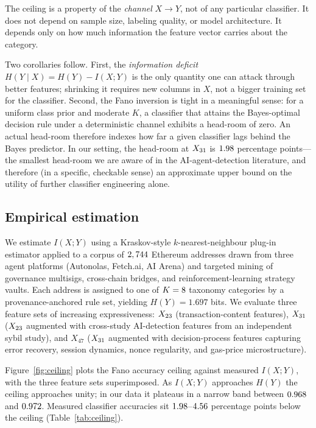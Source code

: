 \documentclass[11pt,a4paper]{article}
\begin{document}
The ceiling is a property of the \emph{channel} $X \to Y$, not of any
particular classifier. It does not depend on sample size, labeling quality,
or model architecture. It depends only on how much information the feature
vector carries about the category.

Two corollaries follow. First, the \emph{information deficit}
$H(Y \mid X) = H(Y) - I(X;Y)$ is the only quantity one can attack through
better features; shrinking it requires new columns in $X$, not a bigger
training set for the classifier. Second, the Fano inversion is tight in a
meaningful sense: for a uniform class prior and moderate $K$, a classifier
that attains the Bayes-optimal decision rule under a deterministic channel
exhibits a head-room of zero. An actual head-room therefore indexes how
far a given classifier lags behind the Bayes predictor. In our setting,
the head-room at $X_{31}$ is $1.98$ percentage points---the smallest
head-room we are aware of in the AI-agent-detection literature, and
therefore (in a specific, checkable sense) an approximate upper bound on
the utility of further classifier engineering alone.

\subsection*{Empirical estimation}

We estimate $I(X;Y)$ using a Kraskov-style $k$-nearest-neighbour plug-in
estimator\cite{kraskov2004estimating} applied to a corpus of $2,744$
Ethereum addresses drawn from three agent platforms (Autonolas, Fetch.ai,
AI Arena) and targeted mining of governance multisigs, cross-chain bridges,
and reinforcement-learning strategy vaults. Each address is assigned to one
of $K=8$ taxonomy categories by a provenance-anchored rule set, yielding
$H(Y) = 1.697$ bits. We evaluate three feature sets of increasing
expressiveness: $X_{23}$ (transaction-content features),
$X_{31}$ ($X_{23}$ augmented with cross-study AI-detection features from an
independent sybil study), and $X_{47}$ ($X_{31}$ augmented with
decision-process features capturing error recovery, session dynamics, nonce
regularity, and gas-price microstructure).

Figure~\ref{fig:ceiling} plots the Fano accuracy ceiling against measured
$I(X;Y)$, with the three feature sets superimposed. As $I(X;Y)$ approaches
$H(Y)$ the ceiling approaches unity; in our data it plateaus in a narrow
band between $0.968$ and $0.972$. Measured classifier accuracies sit
$1.98$--$4.56$ percentage points below the ceiling
(Table~\ref{tab:ceiling}).
\end{document}

